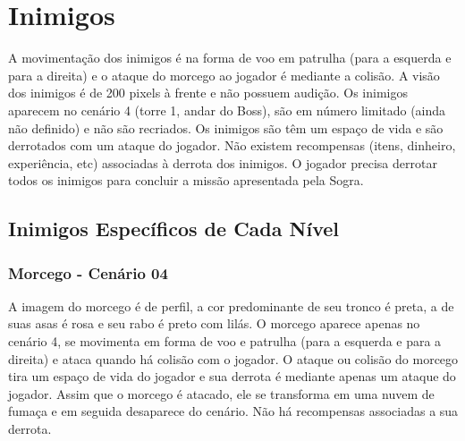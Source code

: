 \documentclass[12pt]{article}
\begin{document}
\newpage

\section{Inimigos}

A movimentação dos inimigos é na forma de voo em patrulha (para a esquerda e
para a direita) e o ataque do morcego ao jogador é mediante a colisão. A visão
dos inimigos é de 200 pixels à frente e não possuem audição. Os inimigos
aparecem no cenário 4 (torre 1, andar do Boss), são em número limitado (ainda
não definido) e não são recriados.  Os inimigos são têm um espaço de vida e são
derrotados com um ataque do jogador. Não existem recompensas (itens, dinheiro,
experiência, etc) associadas à derrota dos inimigos. O jogador precisa derrotar
todos os inimigos para concluir a missão apresentada pela Sogra.

\subsection{Inimigos Específicos de Cada Nível}

\subsubsection{Morcego - Cenário 04}
A imagem do morcego é de perfil, a cor predominante de seu tronco é preta, a de
suas asas é rosa e seu rabo é preto com lilás. O morcego aparece apenas no
cenário 4, se movimenta em forma de voo e patrulha (para a esquerda e para a
direita) e ataca quando há colisão com o jogador. O ataque ou colisão do morcego
tira um espaço de vida do jogador e sua derrota é mediante apenas um ataque do
jogador. Assim que o morcego é atacado, ele se transforma em uma nuvem de fumaça
e em seguida desaparece do cenário. Não há recompensas associadas a sua derrota.
\end{document}
